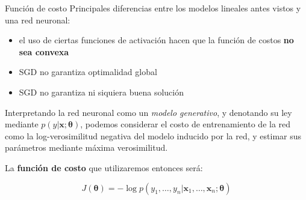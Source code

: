 \documentclass[handout, 9pt]{beamer}
\begin{document}
\begin{frame}{Función de costo}
Principales diferencias entre los modelos lineales antes vistos y una red neuronal:
\begin{itemize}
\item el uso de ciertas funciones de activación hacen que la función de costos \textbf{no sea convexa}
\item SGD no garantiza optimalidad global
\item SGD no garantiza ni siquiera buena solución
\end{itemize}

Interpretando la red neuronal como un \emph{modelo generativo}, y denotando su ley mediante $p(y|\bm{x}; \bm{\theta})$, podemos considerar el costo de entrenamiento de la red como la log-verosimilitud negativa del modelo inducido por la red, y estimar sus parámetros mediante máxima verosimilitud. \pause

La \textbf{función de costo} que utilizaremos entonces será: 

\begin{equation*}
J(\bm{\theta}) = -\log p(y_1,\ldots,y_n|\bm{x}_1,\ldots,\bm{x}_n; \bm{\theta})
\end{equation*}


\end{frame}
     
\end{document}
